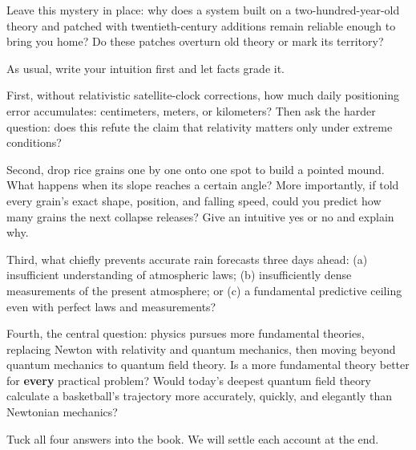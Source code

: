 Leave this mystery in place: why does a system built on a two-hundred-year-old theory and patched with twentieth-century additions remain reliable enough to bring you home? Do these patches overturn old theory or mark its territory?


As usual, write your intuition first and let facts grade it.

First, without relativistic satellite-clock corrections, how much daily positioning error accumulates: centimeters, meters, or kilometers? Then ask the harder question: does this refute the claim that relativity matters only under extreme conditions?

Second, drop rice grains one by one onto one spot to build a pointed mound. What happens when its slope reaches a certain angle? More importantly, if told every grain's exact shape, position, and falling speed, could you predict how many grains the next collapse releases? Give an intuitive yes or no and explain why.

Third, what chiefly prevents accurate rain forecasts three days ahead: (a) insufficient understanding of atmospheric laws; (b) insufficiently dense measurements of the present atmosphere; or (c) a fundamental predictive ceiling even with perfect laws and measurements?

Fourth, the central question: physics pursues more fundamental theories, replacing Newton with relativity and quantum mechanics, then moving beyond quantum mechanics to quantum field theory. Is a more fundamental theory better for \textbf{every} practical problem? Would today's deepest quantum field theory calculate a basketball's trajectory more accurately, quickly, and elegantly than Newtonian mechanics?

Tuck all four answers into the book. We will settle each account at the end.


